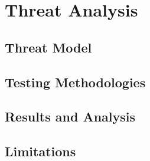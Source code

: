 \chapter{Threat Analysis}
\label{cha:ta}

\lipsum[1]

\section{Threat Model}
\label{sec:ta_model}

\lipsum[1]

\section{Testing Methodologies}
\label{sec:ta_methodologies}

\lipsum[1]

\section{Results and Analysis}
\label{sec:ta_analysis}

\lipsum[1]

\section{Limitations}
\label{sec:ta_limitations}

\lipsum[1]